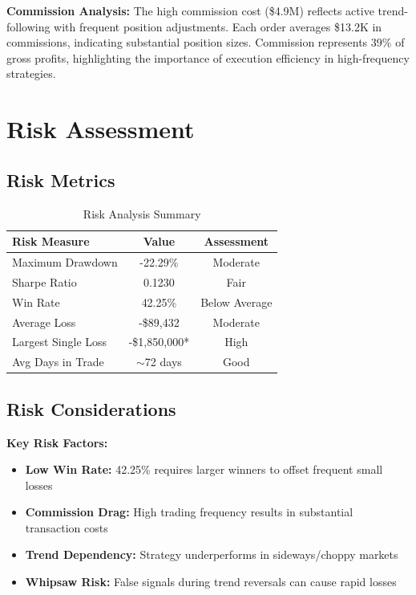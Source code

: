 \documentclass[11pt,a4paper]{article}
\begin{document}
\vspace{0.5cm}

\textbf{Commission Analysis:} The high commission cost (\$4.9M) reflects active trend-following with frequent position adjustments. Each order averages \$13.2K in commissions, indicating substantial position sizes. Commission represents 39\% of gross profits, highlighting the importance of execution efficiency in high-frequency strategies.

\section{Risk Assessment}

\subsection{Risk Metrics}

\begin{table}[H]
\centering
\begin{tabular}{lcc}
\toprule
\textbf{Risk Measure} & \textbf{Value} & \textbf{Assessment} \\
\midrule
Maximum Drawdown & -22.29\% & \textcolor{neutral}{Moderate} \\
Sharpe Ratio & 0.1230 & \textcolor{neutral}{Fair} \\
Win Rate & 42.25\% & \textcolor{loss}{Below Average} \\
Average Loss & -\$89,432 & \textcolor{neutral}{Moderate} \\
Largest Single Loss & -\$1,850,000* & \textcolor{loss}{High} \\
Avg Days in Trade & $\sim$72 days & \textcolor{profit}{Good} \\
\bottomrule
\end{tabular}
\caption{Risk Analysis Summary}
\end{table}

\subsection{Risk Considerations}

\textbf{Key Risk Factors:}
\begin{itemize}
    \item \textbf{Low Win Rate:} 42.25\% requires larger winners to offset frequent small losses
    \item \textbf{Commission Drag:} High trading frequency results in substantial transaction costs
    \item \textbf{Trend Dependency:} Strategy underperforms in sideways/choppy markets
    \item \textbf{Whipsaw Risk:} False signals during trend reversals can cause rapid losses
\end{itemize}
\end{document}
